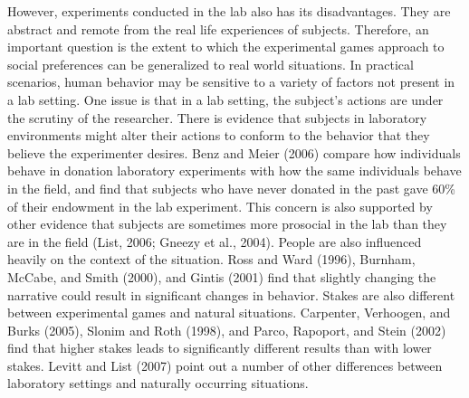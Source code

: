 \documentclass{article}
\begin{document}
However, experiments conducted in the lab also has its disadvantages. They are abstract and remote from the real life experiences of subjects. Therefore, an important question is the extent to which the experimental games approach to social preferences can be generalized to real world situations. In practical scenarios, human behavior may be sensitive to a variety of factors not present in a lab setting. One issue is that in a lab setting, the subject's actions are under the scrutiny of the researcher. There is evidence that subjects in laboratory environments might alter their actions to conform to the behavior that they believe the experimenter desires. Benz and Meier (2006) compare how individuals behave in donation laboratory experiments with how the same individuals behave in the field, and find that subjects who have never donated in the past gave 60\% of their endowment in the lab experiment. This concern is also supported by other evidence that subjects are sometimes more prosocial in the lab than they are in the field (List, 2006; Gneezy et al., 2004). People are also influenced heavily on the context of the situation. Ross and Ward (1996), Burnham, McCabe, and Smith (2000), and Gintis (2001) find that slightly changing the narrative could result in significant changes in behavior. Stakes are also different between experimental games and natural situations. Carpenter, Verhoogen, and Burks (2005), Slonim and Roth (1998), and Parco, Rapoport, and Stein (2002) find that higher stakes leads to significantly different results than with lower stakes. Levitt and List (2007) point out a number of other differences between laboratory settings and naturally occurring situations.\\
 
\end{document}
